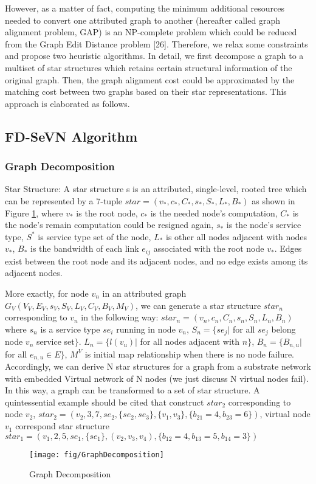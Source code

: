 However, as a matter of fact, computing the minimum additional
resources needed to convert one attributed graph to
another (hereafter called graph alignment problem, GAP) is an
NP-complete problem which could be reduced from the Graph
Edit Distance problem [26]. Therefore, we relax some constraints
and propose two heuristic algorithms. In detail, we first
decompose a graph to a multiset of star structures which retains
certain structural information of the original graph. Then, the
graph alignment cost could be approximated by the matching
cost between two graphs based on their star representations.
This approach is elaborated as follows.

\subsection{FD-SeVN Algorithm}
\subsubsection{Graph Decomposition}
Star Structure: A star structure s is an attributed, single-level, rooted tree which can be represented by a 7-tuple $star=(v_*,c_*,C_*,s_*,S_*,L_*,B_*)$ as shown in Figure \ref{fig:GraphDecomposition}, where $v_*$ is the root node, $c_*$ is the needed node's computation, $C_*$ is the node's remain computation could be resigned again, $s_*$ is the node's service type, $S^*$ is service type set of the node, $L_*$ is other all nodes  adjacent with nodes $v_*$, $B_*$ is the bandwidth of each link $e_{ij}$ associated with the root node $v_*$. Edges exist between the root node and its adjacent nodes, and no edge exists among its adjacent nodes.

More exactly, for node $v_n$ in an attributed graph  $G_V (V_V,E_V,s_V,S_V,L_V,C_V,B_V,M_V)$, we can generate a star structure $star_n$ corresponding to $v_n$ in the following way: $star_n=(v_n,c_n,C_n,s_n,S_n,L_n,B_n)$ where $s_n$ is a service type $se_i$ running in node $v_n$, $S_n=\{se_{j}|$ for all $se_j$ belong node $v_n$ service set$\}$.  $L_n=\{l(v_u)|$ for all nodes  adjacent with $n\}$, $B_n=\{B_{n,u}| $for all $e_{n,u}\in E\}$, $M^V$ is initial map relationship when there is no node failure. Accordingly, we can derive N star structures for a graph from a substrate network with embedded Virtual network of N nodes (we just discuss N virtual nodes fail). In this way, a graph can be transformed to a set of star structure. A quintessential example should be cited that construct $star_2$ corresponding to node $v_2$, $star_2=(v_2,3,7,se_2,\{se_2,se_3\},\{v_1,v_3\},\{b_{21}=4,b_{23}=6\})$, virtual node $v_1$ correspond star structure $star_1=(v_1,2,5,se_1,\{se_1\},(v_2,v_3,v_4),\{b_{12}=4,b_{13}=5,b_{14}=3\})$
\begin{figure}
\centering
\texttt{[image: fig/GraphDecomposition]}\\
\caption{Graph Decomposition}\label{fig:GraphDecomposition}
\end{figure}
